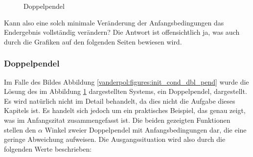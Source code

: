 \begin{figure}
\centering
{}
\caption{Doppelpendel\label{vanderpol:figures:doublependulum}}
\end{figure}
Kann also eine solch minimale Veränderung der Anfangsbedingungen das Endergebnis vollständig verändern? Die Antwort ist offensichtlich ja, was auch durch die Grafiken auf den folgenden Seiten bewiesen wird.
\subsubsection{Doppelpendel \cite{vanderpol:bibdopperlpendel}}
\label{vanderpol:subsubsection:doppelpendel}
Im Falle des Bildes Abbildung \ref{vanderpol:figures:init_cond_dbl_pend} wurde die Lösung des im Abbildung \ref{vanderpol:figures:doublependulum} dargestellten Systems, ein Doppelpendel, dargestellt. Es wird natürlich nicht im Detail behandelt, da dies nicht die Aufgabe dieses Kapitels ist. Es handelt sich jedoch um ein praktisches Beispiel, das genau zeigt, was im Anfangszitat zusammengefasst ist. Die beiden gezeigten Funktionen stellen den $\alpha$ Winkel zweier Doppelpendel mit Anfangsbedingungen dar, die eine geringe Abweichung aufweisen. Die Ausgangssituation wird also durch die folgenden Werte beschrieben:

